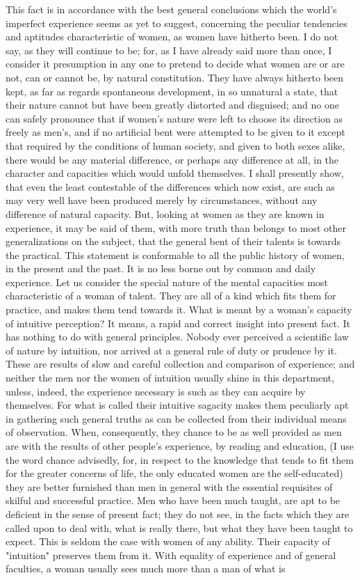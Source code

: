 \documentclass[12pt]{report}
\begin{document}
This fact is in accordance with the best general conclusions which the world's imperfect experience seems as yet to suggest, concerning the peculiar tendencies and aptitudes characteristic of women, as women have hitherto been. I do not say, as they will continue to be; for, as I have already said more than once, I consider it presumption in any one to pretend to decide what women are or are not, can or cannot be, by natural constitution. They have always hitherto been kept, as far as regards spontaneous development, in so unnatural a state, that their nature cannot but have been greatly distorted and disguised; and no one can safely pronounce that if women's nature were left to choose its direction as freely as men's, and if no artificial bent were attempted to be given to it except that required by the conditions of human society, and given to both sexes alike, there would be any material difference, or perhaps any difference at all, in the character and capacities which would unfold themselves. I shall presently show, that even the least contestable of the differences which now exist, are such as may very well have been produced merely by circumstances, without any difference of natural capacity. But, looking at women as they are known in experience, it may be said of them, with more truth than belongs to most other generalizations on the subject, that the general bent of their talents is towards the practical. This statement is conformable to all the public history of women, in the present and the past. It is no less borne out by common and daily experience. Let us consider the special nature of the mental capacities most characteristic of a woman of talent. They are all of a kind which fits them for practice, and makes them tend towards it. What is meant by a woman's capacity of intuitive perception? It means, a rapid and correct insight into present fact. It has nothing to do with general principles. Nobody ever perceived a scientific law of nature by intuition, nor arrived at a general rule of duty or prudence by it. These are results of slow and careful collection and comparison of experience; and neither the men nor the women of intuition usually shine in this department, unless, indeed, the experience necessary is such as they can acquire by themselves. For what is called their intuitive sagacity makes them peculiarly apt in gathering such general truths as can be collected from their individual means of observation. When, consequently, they chance to be as well provided as men are with the results of other people's experience, by reading and education, (I use the word chance advisedly, for, in respect to the knowledge that tends to fit them for the greater concerns of life, the only educated women are the self-educated) they are better furnished than men in general with the essential requisites of skilful and successful practice. Men who have been much taught, are apt to be deficient in the sense of present fact; they do not see, in the facts which they are called upon to deal with, what is really there, but what they have been taught to expect. This is seldom the case with women of any ability. Their capacity of "intuition" preserves them from it. With equality of experience and of general faculties, a woman usually sees much more than a man of what is 
\end{document}
